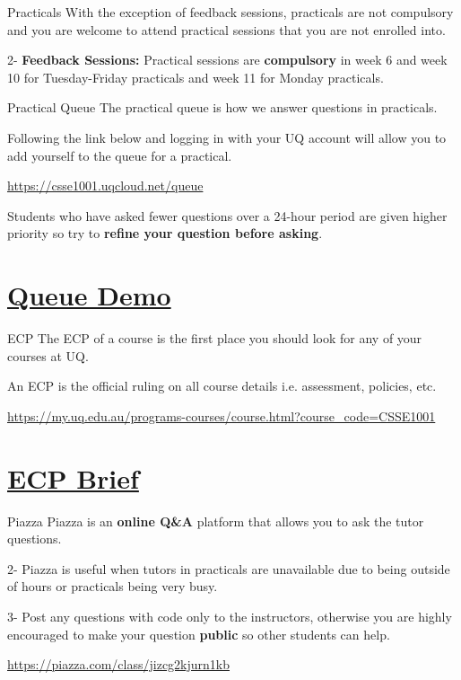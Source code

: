 \documentclass[week1]{csse1001}
\begin{document}
\begin{topic}{Practicals}
With the exception of feedback sessions, practicals are not compulsory and you are welcome to attend practical sessions that you are not enrolled into.

\begin{subtopic}{2-}
\textbf{Feedback Sessions:} Practical sessions are \textbf{compulsory} in week 6 and week 10 for Tuesday-Friday practicals and week 11 for Monday practicals.
\end{subtopic}
\end{topic}

\begin{topic}{Practical Queue}
The practical queue is how we answer questions in practicals.

Following the link below and logging in with your UQ account will allow you to add yourself to the queue for a practical.

\url{https://csse1001.uqcloud.net/queue}

Students who have asked fewer questions over a 24-hour period are given higher priority so try to \textbf{refine your question before asking}.
\end{topic}

\section{\href{https://csse1001.uqcloud.net/queue}{Queue Demo}}

\begin{topic}{ECP}
The ECP of a course is the first place you should look for any of your courses at UQ.

An ECP is the official ruling on all course details i.e. assessment, policies, etc.

\url{https://my.uq.edu.au/programs-courses/course.html?course_code=CSSE1001}
\end{topic}

\section{\href{https://my.uq.edu.au/programs-courses/course.html?course_code=CSSE1001}{ECP Brief}}

\begin{topic}{Piazza}
Piazza is an \textbf{online Q\&A} platform that allows you to ask the tutor questions.

\begin{subtopic}{2-}
Piazza is useful when tutors in practicals are unavailable due to being outside of hours or practicals being very busy.
\end{subtopic}

\begin{subtopic}{3-}
Post any questions with code only to the instructors, otherwise you are highly encouraged to make your question \textbf{public} so other students can help.
\end{subtopic}

\url{https://piazza.com/class/jizcg2kjurn1kb}
\end{topic}
\end{document}
